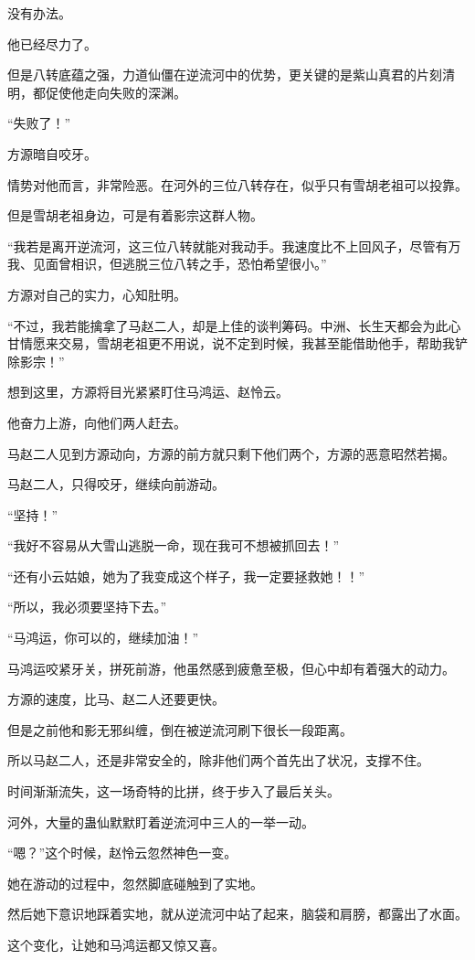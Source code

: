 \begin{this_body}
没有办法。

他已经尽力了。

但是八转底蕴之强，力道仙僵在逆流河中的优势，更关键的是紫山真君的片刻清明，都促使他走向失败的深渊。

“失败了！”

方源暗自咬牙。

情势对他而言，非常险恶。在河外的三位八转存在，似乎只有雪胡老祖可以投靠。

但是雪胡老祖身边，可是有着影宗这群人物。

“我若是离开逆流河，这三位八转就能对我动手。我速度比不上回风子，尽管有万我、见面曾相识，但逃脱三位八转之手，恐怕希望很小。”

方源对自己的实力，心知肚明。

“不过，我若能擒拿了马赵二人，却是上佳的谈判筹码。中洲、长生天都会为此心甘情愿来交易，雪胡老祖更不用说，说不定到时候，我甚至能借助他手，帮助我铲除影宗！”

想到这里，方源将目光紧紧盯住马鸿运、赵怜云。

他奋力上游，向他们两人赶去。

马赵二人见到方源动向，方源的前方就只剩下他们两个，方源的恶意昭然若揭。

马赵二人，只得咬牙，继续向前游动。

“坚持！”

“我好不容易从大雪山逃脱一命，现在我可不想被抓回去！”

“还有小云姑娘，她为了我变成这个样子，我一定要拯救她！！”

“所以，我必须要坚持下去。”

“马鸿运，你可以的，继续加油！”

马鸿运咬紧牙关，拼死前游，他虽然感到疲惫至极，但心中却有着强大的动力。

方源的速度，比马、赵二人还要更快。

但是之前他和影无邪纠缠，倒在被逆流河刷下很长一段距离。

所以马赵二人，还是非常安全的，除非他们两个首先出了状况，支撑不住。

时间渐渐流失，这一场奇特的比拼，终于步入了最后关头。

河外，大量的蛊仙默默盯着逆流河中三人的一举一动。

“嗯？”这个时候，赵怜云忽然神色一变。

她在游动的过程中，忽然脚底碰触到了实地。

然后她下意识地踩着实地，就从逆流河中站了起来，脑袋和肩膀，都露出了水面。

这个变化，让她和马鸿运都又惊又喜。


\end{this_body}
